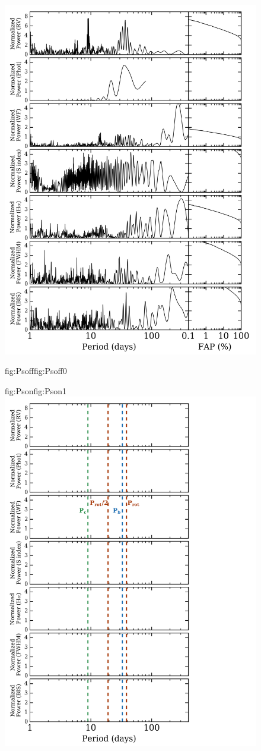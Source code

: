 \begin{figure}
  \centering
  \includegraphics[width=0.8\hsize]{figures/periodograms_bkgd.png}%
   \hspace{-0.8\hsize}%
  \begin{ocg}{fig:Psoff}{fig:Psoff}{0}%
  \end{ocg}%
  \begin{ocg}{fig:Pson}{fig:Pson}{1}%
    \includegraphics[width=0.8\hsize]{figures/periodograms_Ps.png}%

\end{ocg}
\end{figure}
